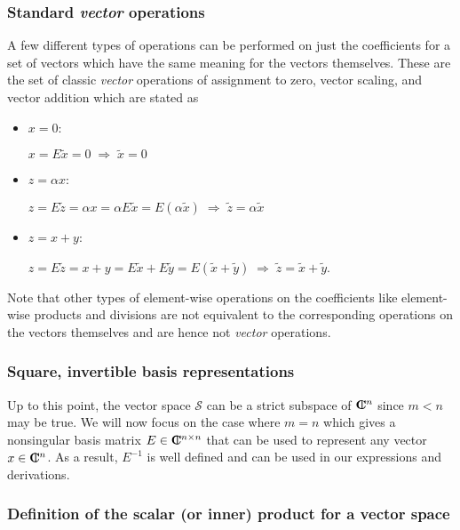 \subsubsection{Standard {}\textit{vector} operations}

A few different types of operations can be performed on just the coefficients
for a set of vectors which have the same meaning for the vectors themselves.
These are the set of classic {}\textit{vector} operations of assignment to
zero, vector scaling, and vector addition which are stated as

\begin{itemize}

{}\item $x = 0$:

$x = E \tilde{x} = 0 \; \Rightarrow \; \tilde{x} = 0$ 

{}\item $z = \alpha x$:

$z = E \tilde{z} = \alpha x = \alpha E \tilde{x} = E ( \alpha
\tilde{x} ) \; \Rightarrow \; \tilde{z} = \alpha \tilde{x}$

{}\item $z = x + y$:

$z = E \tilde{z} = x + y = E \tilde{x} + E \tilde{y} = E ( \tilde{x} +
\tilde{y} ) \; \Rightarrow \; \tilde{z} = \tilde{x} + \tilde{y}$.

\end{itemize}

Note that other types of element-wise operations on the coefficients like
element-wise products and divisions are not equivalent to the corresponding
operations on the vectors themselves and are hence not {}\textit{vector}
operations.

\subsubsection{Square, invertible basis representations}

Up to this point, the vector space $\mathcal{S}$ can be a strict subspace of
$\mbox{\textbf{C}}\hspace{-1.1ex}\mbox{l}\hspace{0.4ex}^n$ since $m < n$ may be true.  We will now focus on the case where $m =
n$ which gives a nonsingular basis matrix $E\in\mbox{\textbf{C}}\hspace{-1.1ex}\mbox{l}\hspace{0.4ex}^{n\times{}n}$ that can be
used to represent any vector $x\in\mbox{\textbf{C}}\hspace{-1.1ex}\mbox{l}\hspace{0.4ex}^n$.  As a result, $E^{-1}$ is well
defined and can be used in our expressions and derivations.

\subsubsection{Definition of the scalar (or inner) product for a vector space}

